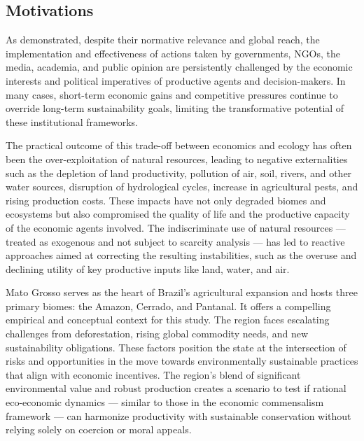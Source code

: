 \subsection{Motivations}

As demonstrated, despite their normative relevance and global reach, the implementation and effectiveness of actions taken by governments, NGOs, the media, academia, and public opinion are persistently challenged by the economic interests and political imperatives of productive agents and decision-makers. In many cases, short-term economic gains and competitive pressures continue to override long-term sustainability goals, limiting the transformative potential of these institutional frameworks.

The practical outcome of this trade-off between economics and ecology has often been the over-exploitation of natural resources, leading to negative externalities such as the depletion of land productivity, pollution of air, soil, rivers, and other water sources, disruption of hydrological cycles, increase in agricultural pests, and rising production costs. These impacts have not only degraded biomes and ecosystems but also compromised the quality of life and the productive capacity of the economic agents involved. The indiscriminate use of natural resources — treated as exogenous and not subject to scarcity analysis — has led to reactive approaches aimed at correcting the resulting instabilities, such as the overuse and declining utility of key productive inputs like land, water, and air.

Mato Grosso serves as the heart of Brazil's agricultural expansion and hosts three primary biomes: the Amazon, Cerrado, and Pantanal. It offers a compelling empirical and conceptual context for this study. The region faces escalating challenges from deforestation, rising global commodity needs, and new sustainability obligations. These factors position the state at the intersection of risks and opportunities in the move towards environmentally sustainable practices that align with economic incentives. The region's blend of significant environmental value and robust production creates a scenario to test if rational eco-economic dynamics — similar to those in the economic commensalism framework — can harmonize productivity with sustainable conservation without relying solely on coercion or moral appeals.

